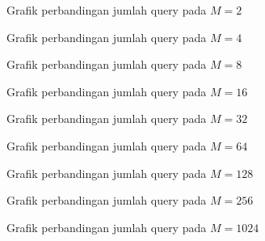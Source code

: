 \begin{figure}
\centering
{}
\caption{Grafik perbandingan jumlah query pada $M=2$}
\label{fig:graph_query1}
\end{figure}

\begin{figure}
\centering
{}
\caption{Grafik perbandingan jumlah query pada $M=4$}
\label{fig:graph_query2}
\end{figure}

\begin{figure}
\centering
{}
\caption{Grafik perbandingan jumlah query pada $M=8$}
\label{fig:graph_query3}
\end{figure}

\begin{figure}
\centering
{}
\caption{Grafik perbandingan jumlah query pada $M=16$}
\label{fig:graph_query4}
\end{figure}

\begin{figure}
\centering
{}
\caption{Grafik perbandingan jumlah query pada $M=32$}
\label{fig:graph_query5}
\end{figure}

\begin{figure}
\centering
{}
\caption{Grafik perbandingan jumlah query pada $M=64$}
\label{fig:graph_query6}
\end{figure}

\begin{figure}
\centering
{}
\caption{Grafik perbandingan jumlah query pada $M=128$}
\label{fig:graph_query7}
\end{figure}

\begin{figure}
\centering
{}
\caption{Grafik perbandingan jumlah query pada $M=256$}
\label{fig:graph_query8}
\end{figure}


\begin{figure}
\centering
{}
\caption{Grafik perbandingan jumlah query pada $M=1024$}
\label{fig:graph_query10}
\end{figure}

